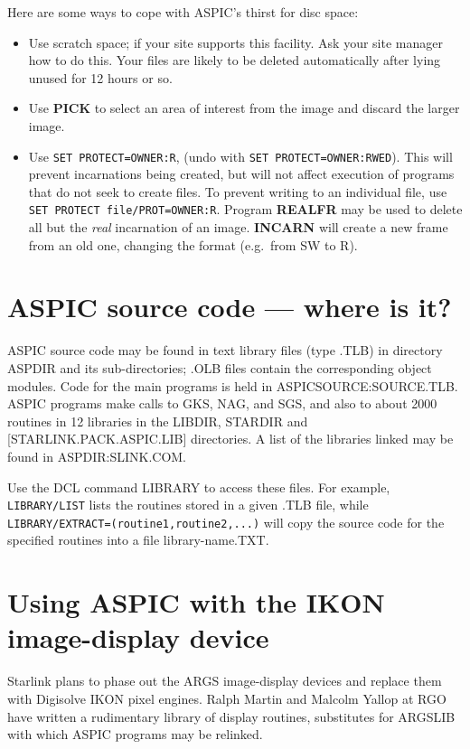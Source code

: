 Here are some ways to cope with ASPIC's thirst for disc space:
\begin{itemize}
\item Use scratch space; if your site supports this facility.
Ask your site manager how to do this.
Your files are likely to be deleted automatically after lying unused for
12 hours or so.
\item Use {\bf PICK} to select an area of interest from the image and discard
the larger image.
\item Use {\tt SET PROTECT=OWNER:R}, (undo with {\tt SET PROTECT=OWNER:RWED}).
This will prevent incarnations being created, but will not affect execution
of programs that do not seek to create files.
To prevent writing to an individual file, use {\tt SET PROTECT
file/PROT=OWNER:R}.
Program {\bf REALFR} may be used to delete all but the {\em real} incarnation
of an image.
{\bf INCARN} will create a new frame from an old one, changing the format
(e.g.\ from SW to R).
\end{itemize}

\section {ASPIC source code --- where is it?}

ASPIC source code may be found in text library files (type .TLB) in directory
ASPDIR and its sub-directories; .OLB files contain the corresponding object
modules.
Code for the main programs is held in ASPICSOURCE:SOURCE.TLB.
ASPIC programs make calls to GKS, NAG, and SGS, and also to about 2000 routines
in 12 libraries in the LIBDIR, STARDIR and [STARLINK.PACK.ASPIC.LIB]
directories.
A list of the libraries linked may be found in ASPDIR:SLINK.COM.

Use the DCL command LIBRARY to access these files.
For example, {\tt LIBRARY/LIST} lists the routines stored in a given .TLB file, 
while {\tt LIBRARY/EXTRACT=(routine1,routine2,...)} will copy the source code
for the specified routines into a file library-name.TXT.

\section{Using ASPIC with the IKON image-display device}

Starlink plans to phase out the ARGS image-display devices and replace them
with Digisolve IKON pixel engines.
Ralph Martin and Malcolm Yallop at RGO have written a rudimentary library
of display routines, substitutes for ARGSLIB with which ASPIC programs may
be relinked.

